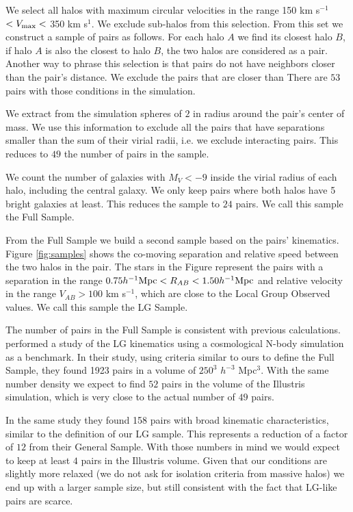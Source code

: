 \documentclass{emulateapj}
\newcommand{\hMpc}{{\ifmmode{h^{-1}{\rm Mpc}}\else{$h^{-1}$Mpc}\fi}}
\begin{document}
We select all halos with maximum circular velocities in the
range 150 km s$^{-1}$ $<V_{\rm max}<$ 350 km s$^{1}$.
We exclude sub-halos from this selection.
From this set we construct a sample of pairs as follows.
For each halo $A$ we find its closest halo $B$, if halo $A$ is also
the closest to halo $B$, the two halos are considered as a pair. 
Another way to phrase this selection is that pairs do not have
neighbors closer than the pair's distance.
We exclude the pairs that are closer than
There are $53$ pairs with those conditions in the simulation.

We extract from the simulation spheres of $2$ \hMpc in radius around
the pair's center of mass. 
We use this information to exclude all the pairs that have separations
smaller than the sum  of their virial radii, i.e. we exclude
interacting pairs. 
This reduces to $49$ the number of pairs in the sample.

We count the number of galaxies with $M_V<-9$ inside the virial
radius of each halo, including the central galaxy.
We only keep pairs where both halos have 5 bright galaxies at least. 
This reduces the sample to $24$ pairs. 
We call this sample the Full  Sample.

From the Full Sample we build a second sample based on the pairs' kinematics. 
Figure \ref{fig:samples} shows the co-moving separation and relative
speed between the two halos in the pair.
The stars in the Figure represent the pairs with a separation in the
range $0.75\hMpc <R_{AB}< 1.50\hMpc$ and relative velocity in the
range $V_{AB}>100$ km s$^{-1}$, which are close to the Local Group
Observed values.
We call this sample the LG Sample.

The number of pairs in the Full Sample is consistent with previous
calculations. 
\cite{ForeroRomero2013} performed a study of the LG kinematics using a
cosmological N-body simulation as a benchmark. 
In their study, using criteria similar to ours to define the Full
Sample, they found 1923 pairs in a volume of $250^3$ $h^{-3}$
Mpc$^{3}$. 
With the same number density we expect to find $52$ pairs in the
volume of the Illustris simulation, which is very close to the actual
number of $49$ pairs.

In the same study they found 158 pairs with broad kinematic
characteristics, similar to the definition of our LG sample. 
This represents a reduction of a factor of $12$ from their General
Sample. 
With those numbers in mind we would expect to keep at least $4$ pairs
in the Illustris volume. 
Given that our conditions are slightly more relaxed (we do not ask for
isolation criteria from massive halos) we end up with a larger sample
size, but still consistent with the fact that LG-like pairs are
scarce.  
\end{document}
